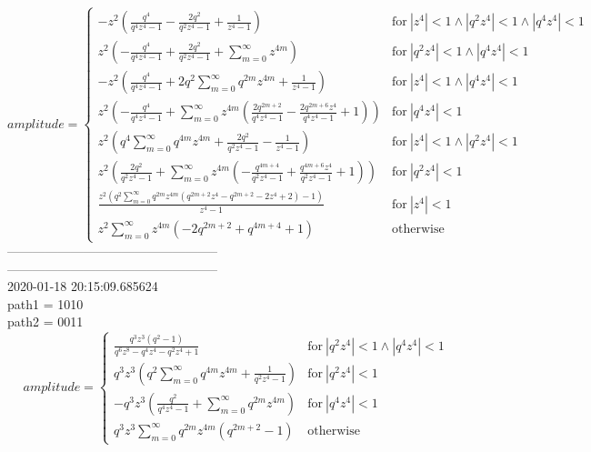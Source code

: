 $$amplitude = \begin{cases} - z^{2} \left(\frac{q^{4}}{q^{4} z^{4} - 1} - \frac{2 q^{2}}{q^{2} z^{4} - 1} + \frac{1}{z^{4} - 1}\right) & \text{for}\: \left|{z^{4}}\right| < 1 \wedge \left|{q^{2} z^{4}}\right| < 1 \wedge \left|{q^{4} z^{4}}\right| < 1 \\z^{2} \left(- \frac{q^{4}}{q^{4} z^{4} - 1} + \frac{2 q^{2}}{q^{2} z^{4} - 1} + \sum_{m=0}^{\infty} z^{4 m}\right) & \text{for}\: \left|{q^{2} z^{4}}\right| < 1 \wedge \left|{q^{4} z^{4}}\right| < 1 \\- z^{2} \left(\frac{q^{4}}{q^{4} z^{4} - 1} + 2 q^{2} \sum_{m=0}^{\infty} q^{2 m} z^{4 m} + \frac{1}{z^{4} - 1}\right) & \text{for}\: \left|{z^{4}}\right| < 1 \wedge \left|{q^{4} z^{4}}\right| < 1 \\z^{2} \left(- \frac{q^{4}}{q^{4} z^{4} - 1} + \sum_{m=0}^{\infty} z^{4 m} \left(\frac{2 q^{2 m + 2}}{q^{4} z^{4} - 1} - \frac{2 q^{2 m + 6} z^{4}}{q^{4} z^{4} - 1} + 1\right)\right) & \text{for}\: \left|{q^{4} z^{4}}\right| < 1 \\z^{2} \left(q^{4} \sum_{m=0}^{\infty} q^{4 m} z^{4 m} + \frac{2 q^{2}}{q^{2} z^{4} - 1} - \frac{1}{z^{4} - 1}\right) & \text{for}\: \left|{z^{4}}\right| < 1 \wedge \left|{q^{2} z^{4}}\right| < 1 \\z^{2} \left(\frac{2 q^{2}}{q^{2} z^{4} - 1} + \sum_{m=0}^{\infty} z^{4 m} \left(- \frac{q^{4 m + 4}}{q^{2} z^{4} - 1} + \frac{q^{4 m + 6} z^{4}}{q^{2} z^{4} - 1} + 1\right)\right) & \text{for}\: \left|{q^{2} z^{4}}\right| < 1 \\\frac{z^{2} \left(q^{2} \sum_{m=0}^{\infty} q^{2 m} z^{4 m} \left(q^{2 m + 2} z^{4} - q^{2 m + 2} - 2 z^{4} + 2\right) - 1\right)}{z^{4} - 1} & \text{for}\: \left|{z^{4}}\right| < 1 \\z^{2} \sum_{m=0}^{\infty} z^{4 m} \left(- 2 q^{2 m + 2} + q^{4 m + 4} + 1\right) & \text{otherwise} \end{cases}$$
--------------------------------------------------\\
--------------------------------------------------\\
2020-01-18 20:15:09.685624\\
path1 = 1010\\
path2 = 0011\\
$$amplitude = \begin{cases} \frac{q^{3} z^{3} \left(q^{2} - 1\right)}{q^{6} z^{8} - q^{4} z^{4} - q^{2} z^{4} + 1} & \text{for}\: \left|{q^{2} z^{4}}\right| < 1 \wedge \left|{q^{4} z^{4}}\right| < 1 \\q^{3} z^{3} \left(q^{2} \sum_{m=0}^{\infty} q^{4 m} z^{4 m} + \frac{1}{q^{2} z^{4} - 1}\right) & \text{for}\: \left|{q^{2} z^{4}}\right| < 1 \\- q^{3} z^{3} \left(\frac{q^{2}}{q^{4} z^{4} - 1} + \sum_{m=0}^{\infty} q^{2 m} z^{4 m}\right) & \text{for}\: \left|{q^{4} z^{4}}\right| < 1 \\q^{3} z^{3} \sum_{m=0}^{\infty} q^{2 m} z^{4 m} \left(q^{2 m + 2} - 1\right) & \text{otherwise} \end{cases}$$
